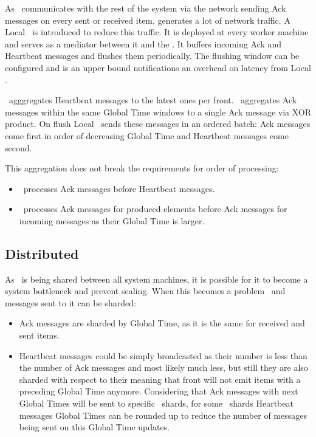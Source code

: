 As \tracker\ communicates with the rest of the system via the network sending Ack messages on every sent or received item, generates a lot of network traffic. A Local \tracker\ is introduced to reduce this traffic. It is deployed at every worker machine and serves as a mediator between it and the \tracker. It buffers incoming Ack and Heartbeat messages and flushes them periodically. The flushing window can be configured and  is an upper bound notifications an overhead on latency from Local \tracker.

\tracker\ agggregates Heartbeat messages to the latest ones per front. \tracker\ aggregates Ack messages within the same Global Time windows to a single Ack message via XOR product. On flush Local \tracker\ sends these messages in an ordered batch: Ack messages come first in order of decreasing Global Time and Heartbeat messages come second.

This aggregation does not break the requirements for order of processing:
\begin{itemize}
	\item \tracker\ processes Ack messages before Heartbeat messages.
	\item \tracker\ processes Ack messages for produced elements before Ack messages for incoming messages as their Global Time is larger.
\end{itemize}

\subsection{Distributed \tracker\ }

As \tracker\ is being shared between all system machines, it is possible for it to become a system bottleneck and prevent scaling. When this becomes a problem \tracker\ and messages sent to it can be sharded:
\begin{itemize}
	\item Ack messages are sharded by Global Time, as it is the same for received and sent items.
	\item Heartbeat messages could be simply broadcasted as their number is less than the number of Ack messages and most likely much less, but still they are also sharded with respect to their meaning that front will not emit items with a preceding Global Time anymore. Considering that Ack messages with next Global Times will be sent to specific \tracker\ shards, for some \tracker\ shards Heartbeat messages Global Times can be rounded up to reduce the number of messages being sent on this Global Time updates.
\end{itemize}

